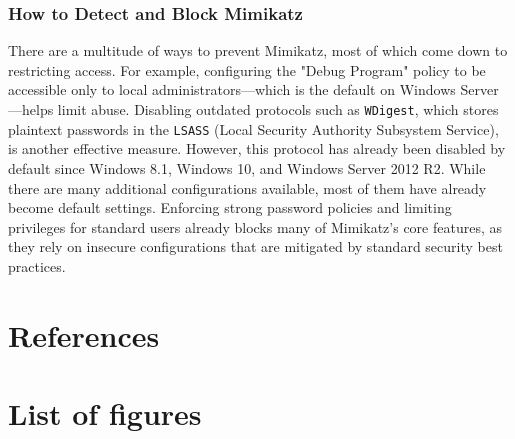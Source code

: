 \documentclass[a4paper]{article}
\begin{document}
\subsubsection{How to Detect and Block Mimikatz}
There are a multitude of ways to prevent Mimikatz, most of which come down to restricting access. For example, configuring the "Debug Program" policy to be accessible only to local administrators—which is the default on Windows Server—helps limit abuse. Disabling outdated protocols such as \texttt{WDigest}, which stores plaintext passwords in the \texttt{LSASS} (Local Security Authority Subsystem Service), is another effective measure. However, this protocol has already been disabled by default since Windows 8.1, Windows 10, and Windows Server 2012 R2. While there are many additional configurations available, most of them have already become default settings. Enforcing strong password policies and limiting privileges for standard users already blocks many of Mimikatz’s core features, as they rely on insecure configurations that are mitigated by standard security best practices. \cite{prevent-mimikatz}


\newpage
\section{References}

\newpage
\section{List of figures}

\listoffigures
\end{document}
